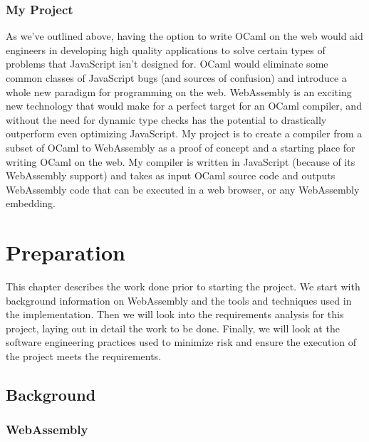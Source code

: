 \documentclass[12pt,a4paper,twoside,openright]{report}
\begin{document}
\subsection{My Project}

As we've outlined above, having the option to write OCaml on the web would aid engineers in developing high quality applications to solve certain types of problems that JavaScript isn't designed for.
OCaml would eliminate some common classes of JavaScript bugs (and sources of confusion) and introduce a whole new paradigm for programming on the web.
WebAssembly is an exciting new technology that would make for a perfect target for an OCaml compiler, and without the need for dynamic type checks has the potential to drastically outperform even optimizing JavaScript.
My project is to create a compiler from a subset of OCaml to WebAssembly as a proof of concept and a starting place for writing OCaml on the web.
My compiler is written in JavaScript (because of its WebAssembly support) and takes as input OCaml source code and outputs WebAssembly code that can be executed in a web browser, or any WebAssembly embedding.

\chapter{Preparation}

This chapter describes the work done prior to starting the project.
We start with background information on WebAssembly and the tools and techniques used in the implementation.
Then we will look into the requirements analysis for this project, laying out in detail the work to be done.
Finally, we will look at the software engineering practices used to minimize risk and ensure the execution of the project meets the requirements.

\section{Background}
\subsection{WebAssembly}
\end{document}
